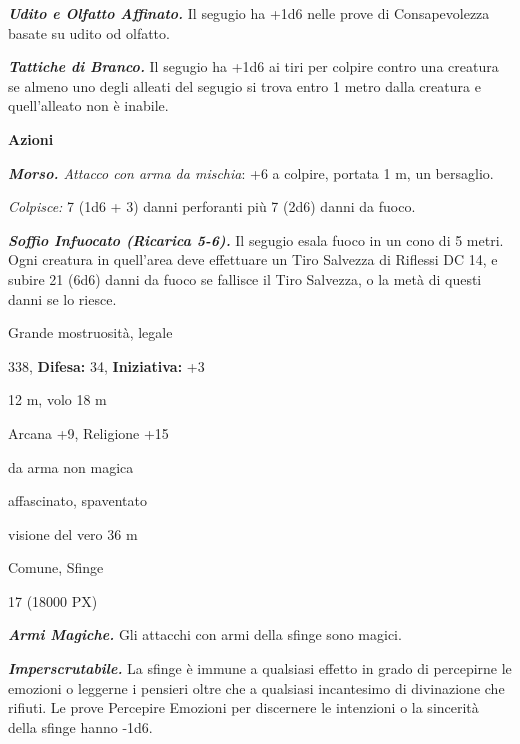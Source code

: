 \begin{multicols}{2}
{\emph{\textbf{Udito e Olfatto Affinato.}} Il segugio ha +1d6 nelle prove di Consapevolezza basate su udito od olfatto.

\emph{\textbf{Tattiche di Branco.}} Il segugio ha +1d6 ai tiri per colpire contro una creatura se almeno uno degli alleati del segugio si trova entro 1 metro dalla creatura e quell'alleato non è inabile.

\textbf{Azioni}

\emph{\textbf{Morso.} Attacco con arma da mischia}: +6 a colpire, portata 1 m, un bersaglio.

\emph{Colpisce:} 7 (1d6 + 3) danni perforanti più 7 (2d6) danni da fuoco.

\emph{\textbf{Soffio Infuocato (Ricarica 5-6).}} Il segugio esala fuoco in un cono di 5 metri. Ogni creatura in quell'area deve effettuare un Tiro Salvezza di Riflessi DC 14, e subire 21 (6d6) danni da fuoco se fallisce il Tiro Salvezza, o la metà di questi danni se lo riesce.

\noindent
\begin{description}[noitemsep, topsep=0pt, parsep=0pt, partopsep=0pt, leftmargin=0cm, labelwidth=2.2cm]
	\item[\textbf{Taglia/Tipo:}] Grande mostruosità, legale
	\item[\textbf{Caratt.:}] 
	\item[\textbf{Punti Ferita:}] 338,  \textbf{Difesa:} 34,  \textbf{Iniziativa:} +3
	\item[\textbf{Movimento:}] 12 m, volo 18 m
	\item[\textbf{Tiri Salvez.:}] 
	\item[\textbf{Comp.:}] Arcana +9, Religione +15
	\item[\textbf{Imm. Danni:}] da arma non magica
	\item[\textbf{Immunità:}] affascinato, spaventato
	\item[\textbf{Sensi:}] visione del vero 36 m
	\item[\textbf{Linguaggi:}] Comune, Sfinge
	\item[\textbf{Sfida:}] 17 (18000 PX)\smallskip
\end{description}

\emph{\textbf{Armi Magiche.}} Gli attacchi con armi della sfinge sono magici.

\emph{\textbf{Imperscrutabile.}} La sfinge è immune a qualsiasi effetto in grado di percepirne le emozioni o leggerne i pensieri oltre che a qualsiasi incantesimo di divinazione che rifiuti. Le prove Percepire Emozioni per discernere le intenzioni o la sincerità della sfinge hanno -1d6.


}
\end{multicols}
